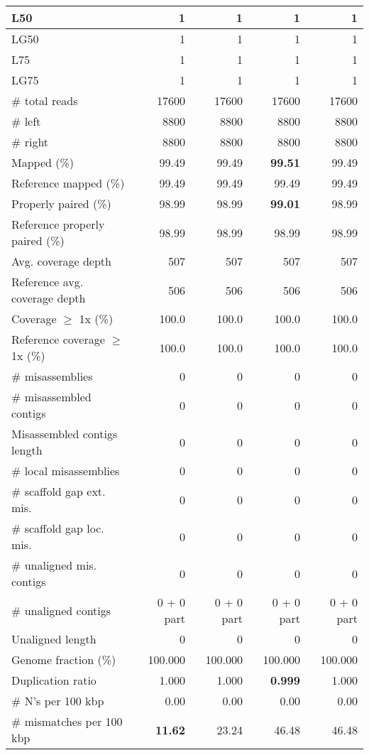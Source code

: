 \documentclass[12pt,a4paper]{article}
\begin{document}
\begin{table}[ht]
\begin{center}
\begin{tabular}{|l*{4}{|r}|}
L50 & 1 & 1 & 1 & 1 \\ \hline
LG50 & 1 & 1 & 1 & 1 \\ \hline
L75 & 1 & 1 & 1 & 1 \\ \hline
LG75 & 1 & 1 & 1 & 1 \\ \hline
\# total reads & 17600 & 17600 & 17600 & 17600 \\ \hline
\# left & 8800 & 8800 & 8800 & 8800 \\ \hline
\# right & 8800 & 8800 & 8800 & 8800 \\ \hline
Mapped (\%) & 99.49 & 99.49 & {\bf 99.51} & 99.49 \\ \hline
Reference mapped (\%) & 99.49 & 99.49 & 99.49 & 99.49 \\ \hline
Properly paired (\%) & 98.99 & 98.99 & {\bf 99.01} & 98.99 \\ \hline
Reference properly paired (\%) & 98.99 & 98.99 & 98.99 & 98.99 \\ \hline
Avg. coverage depth & 507 & 507 & 507 & 507 \\ \hline
Reference avg. coverage depth & 506 & 506 & 506 & 506 \\ \hline
Coverage $\geq$ 1x (\%) & 100.0 & 100.0 & 100.0 & 100.0 \\ \hline
Reference coverage $\geq$ 1x (\%) & 100.0 & 100.0 & 100.0 & 100.0 \\ \hline
\# misassemblies & 0 & 0 & 0 & 0 \\ \hline
\# misassembled contigs & 0 & 0 & 0 & 0 \\ \hline
Misassembled contigs length & 0 & 0 & 0 & 0 \\ \hline
\# local misassemblies & 0 & 0 & 0 & 0 \\ \hline
\# scaffold gap ext. mis. & 0 & 0 & 0 & 0 \\ \hline
\# scaffold gap loc. mis. & 0 & 0 & 0 & 0 \\ \hline
\# unaligned mis. contigs & 0 & 0 & 0 & 0 \\ \hline
\# unaligned contigs & 0 + 0 part & 0 + 0 part & 0 + 0 part & 0 + 0 part \\ \hline
Unaligned length & 0 & 0 & 0 & 0 \\ \hline
Genome fraction (\%) & 100.000 & 100.000 & 100.000 & 100.000 \\ \hline
Duplication ratio & 1.000 & 1.000 & {\bf 0.999} & 1.000 \\ \hline
\# N's per 100 kbp & 0.00 & 0.00 & 0.00 & 0.00 \\ \hline
\# mismatches per 100 kbp & {\bf 11.62} & 23.24 & 46.48 & 46.48 \\ \hline

\end{tabular}
\end{center}
\end{table}
\end{document}
